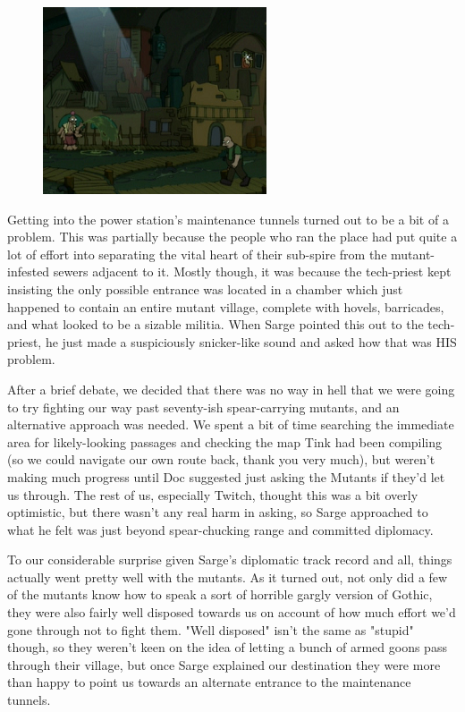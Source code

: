\begin{figure}
	\begin{center}
		\includegraphics[width=\figwidth]{pics/18/7.png}
	\end{center}
\end{figure}
Getting into the power station's maintenance tunnels turned out to be a bit of a problem. 
This was partially because the people who ran the place had put quite a lot of effort into separating the vital heart of their sub-spire from the mutant-infested sewers adjacent to it. 
Mostly though, it was because the tech-priest kept insisting the only possible entrance was located in a chamber which just happened to contain an entire mutant village, complete with hovels, barricades, and what looked to be a sizable militia. 
When Sarge pointed this out to the tech-priest, he just made a suspiciously snicker-like sound and asked how that was HIS problem. 


After a brief debate, we decided that there was no way in hell that we were going to try fighting our way past seventy-ish spear-carrying mutants, and an alternative approach was needed. 
We spent a bit of time searching the immediate area for likely-looking passages and checking the map Tink had been compiling (so we could navigate our own route back, thank you very much), but weren't making much progress until Doc suggested just asking the Mutants if they'd let us through. 
The rest of us, especially Twitch, thought this was a bit overly optimistic, but there wasn't any real harm in asking, so Sarge approached to what he felt was just beyond spear-chucking range and committed diplomacy.

To our considerable surprise given Sarge's diplomatic track record and all, things actually went pretty well with the mutants. 
As it turned out, not only did a few of the mutants know how to speak a sort of horrible gargly version of Gothic, they were also fairly well disposed towards us on account of how much effort we'd gone through not to fight them. 
"Well disposed" isn't the same as "stupid" though, so they weren't keen on the idea of letting a bunch of armed goons pass through their village, but once Sarge explained our destination they were more than happy to point us towards an alternate entrance to the maintenance tunnels.


